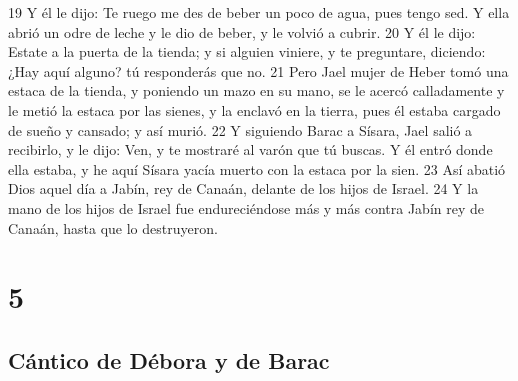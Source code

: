 19 Y él le dijo: Te ruego me des de beber un poco de agua, pues tengo sed. Y ella abrió un odre de leche y le dio de beber, y le volvió a cubrir.
20 Y él le dijo: Estate a la puerta de la tienda; y si alguien viniere, y te preguntare, diciendo: ¿Hay aquí alguno? tú responderás que no.
21 Pero Jael mujer de Heber tomó una estaca de la tienda, y poniendo un mazo en su mano, se le acercó calladamente y le metió la estaca por las sienes, y la enclavó en la tierra, pues él estaba cargado de sueño y cansado; y así murió.
22 Y siguiendo Barac a Sísara, Jael salió a recibirlo, y le dijo: Ven, y te mostraré al varón que tú buscas. Y él entró donde ella estaba, y he aquí Sísara yacía muerto con la estaca por la sien.
23 Así abatió Dios aquel día a Jabín, rey de Canaán, delante de los hijos de Israel.
24 Y la mano de los hijos de Israel fue endureciéndose más y más contra Jabín rey de Canaán, hasta que lo destruyeron.

\chapter{5}

\section*{Cántico de Débora y de Barac}

